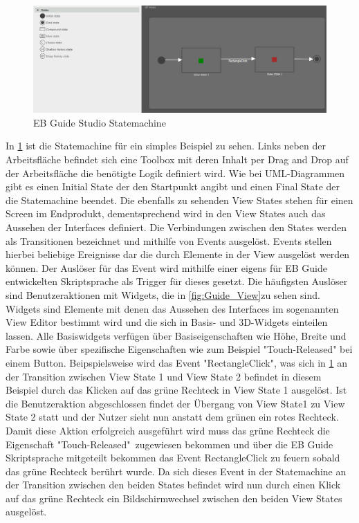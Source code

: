 \begin{figure} [!h]
\begin{center}
  \includegraphics[scale=0.4]{figures/Guide_Statemachine.PNG}
  \caption{EB Guide Studio Statemachine}
  \label{fig:Guide_Statemachine}
\end{center}
\end{figure}

In \cref{fig:Guide_Statemachine} ist die Statemachine für ein simples Beispiel zu sehen.
Links neben der Arbeitsfläche befindet sich eine Toolbox mit deren Inhalt per Drag and Drop auf der Arbeitsfläche die benötigte Logik definiert wird.
Wie bei UML-Diagrammen gibt es einen Initial State der den Startpunkt angibt und einen Final State der die Statemachine beendet.
Die ebenfalls zu sehenden View States stehen für einen Screen im Endprodukt, dementsprechend wird in den View States auch das Aussehen der Interfaces definiert.
Die Verbindungen zwischen den States werden als Transitionen bezeichnet und mithilfe von Events ausgelöst.
Events stellen hierbei beliebige Ereignisse dar die durch Elemente in der View ausgelöst werden können.
Der Auslöser für das Event wird mithilfe einer eigens für EB Guide entwickelten Skriptsprache als Trigger für dieses gesetzt.
Die häufigsten Auslöser sind Benutzeraktionen mit Widgets, die in \cref{fig:Guide_View}zu sehen sind.
Widgets sind Elemente mit denen das Aussehen des Interfaces im sogenannten View Editor bestimmt wird und die sich in Basis- und 3D-Widgets einteilen lassen.
Alle Basiswidgets verfügen über Basiseigenschaften wie Höhe, Breite und Farbe sowie über spezifische Eigenschaften wie zum Beispiel "Touch-Released" bei einem Button.\cite{studio_guide}
Beipspielsweise wird das Event "RectangleClick", was sich in \cref{fig:Guide_Statemachine} an der Transition zwischen View State 1 und View State 2 befindet in diesem Beispiel durch das Klicken auf das grüne Rechteck in View State 1 ausgelöst.
Ist die Benutzeraktion abgeschlossen findet der Übergang von View State1 zu View State 2 statt und der Nutzer sieht nun anstatt dem grünen ein rotes Rechteck.
Damit diese Aktion erfolgreich ausgeführt wird muss das grüne Rechteck die Eigenschaft "Touch-Released"\ zugewiesen bekommen und über die EB Guide Skriptsprache mitgeteilt bekommen das Event RectangleClick zu feuern sobald das grüne Rechteck berührt wurde.
Da sich dieses Event in der Statemachine an der Transition zwischen den beiden States befindet wird nun durch einen Klick auf das grüne Rechteck ein Bildschirmwechsel zwischen den beiden View States ausgelöst.

